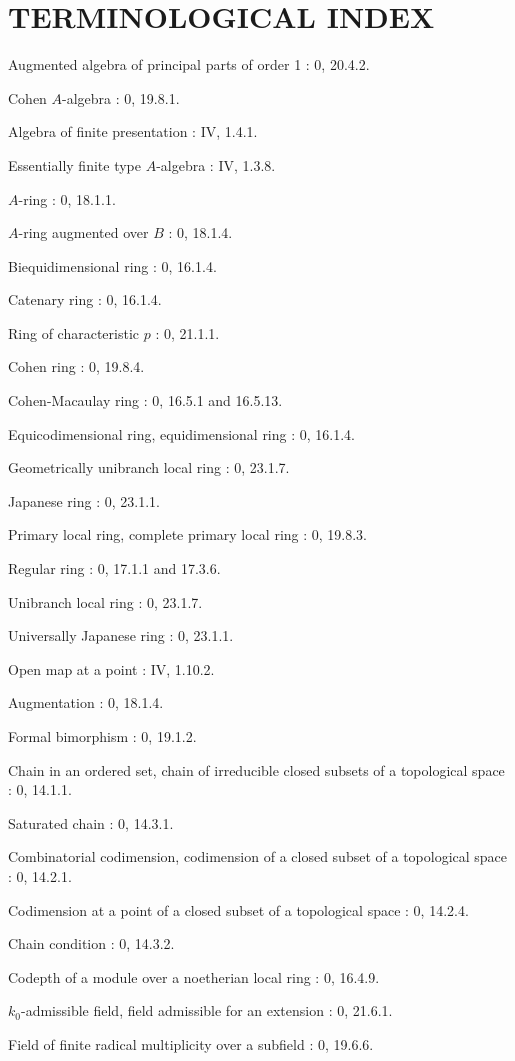 \clearpage
{}
{}
\section*{TERMINOLOGICAL INDEX}

Augmented algebra of principal parts of order 1 : 0, 20.4.2.\par
Cohen $A$-algebra : 0, 19.8.1.\par
Algebra of finite presentation : IV, 1.4.1.\par
Essentially finite type $A$-algebra : IV, 1.3.8.\par
$A$-ring : 0, 18.1.1.\par
$A$-ring augmented over $B$ : 0, 18.1.4.\par
Biequidimensional ring : 0, 16.1.4.\par
Catenary ring : 0, 16.1.4.\par
Ring of characteristic $p$ : 0, 21.1.1.\par
Cohen ring : 0, 19.8.4.\par
Cohen-Macaulay ring : 0, 16.5.1 and 16.5.13.\par
Equicodimensional ring, equidimensional ring : 0, 16.1.4.\par
Geometrically unibranch local ring : 0, 23.1.7.\par
Japanese ring : 0, 23.1.1.\par
Primary local ring, complete primary local ring : 0, 19.8.3.\par
Regular ring : 0, 17.1.1 and 17.3.6.\par
Unibranch local ring : 0, 23.1.7.\par
Universally Japanese ring : 0, 23.1.1.\par
Open map at a point : IV, 1.10.2.\par
Augmentation : 0, 18.1.4.\par

Formal bimorphism : 0, 19.1.2.\par

Chain in an ordered set, chain of irreducible closed subsets of a topological space : 0, 14.1.1.\par
Saturated chain : 0, 14.3.1.\par
Combinatorial codimension, codimension of a closed subset of a topological space : 0, 14.2.1.\par
Codimension at a point of a closed subset of a topological space : 0, 14.2.4.\par
Chain condition : 0, 14.3.2.\par
Codepth of a module over a noetherian local ring : 0, 16.4.9.\par
$k_0$-admissible field, field admissible for an extension : 0, 21.6.1.\par
Field of finite radical multiplicity over a subfield : 0, 19.6.6.\par

